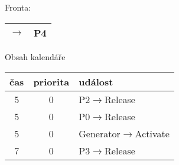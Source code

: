 \documentclass[11pt]{article} %
\begin{document}
\vskip 0.3cm
\noindent
Fronta:
\begin{tabular}{|rl|}
\hline
$\rightarrow$ & P4 \\
\hline
\end{tabular}

\vskip 0.3cm
\noindent
Obsah kalendáře
\begin{tabular}{|c|c|l|}
\hline
čas & priorita & událost \\
\hline
5 & 0 & P2$\rightarrow$Release\\
5 & 0 & P0$\rightarrow$Release\\
5 & 0 & Generator$\rightarrow$Activate\\
7 & 0 & P3$\rightarrow$Release\\
\hline
\end{tabular}


\newpage
\end{document}
